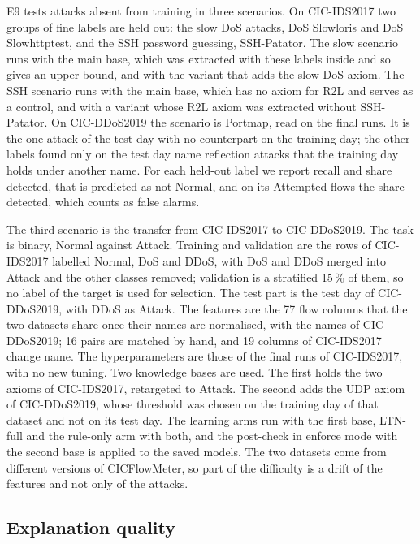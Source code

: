 E9 tests attacks absent from training in three scenarios. On CIC-IDS2017 two groups of fine labels
are held out: the slow DoS attacks, DoS Slowloris and DoS Slowhttptest, and the SSH password
guessing, SSH-Patator. The slow scenario runs with the main base, which was extracted with these
labels inside and so gives an upper bound, and with the variant that adds the slow DoS axiom. The
SSH scenario runs with the main base, which has no axiom for R2L and serves as a control, and with
a variant whose R2L axiom was extracted without SSH-Patator. On CIC-DDoS2019 the scenario is
Portmap, read on the final runs. It is the one attack of the test day with no counterpart on the
training day; the other labels found only on the test day name reflection attacks that the
training day holds under another name. For each held-out label we report recall and share
detected, that is predicted as not Normal, and on its Attempted flows the share detected, which
counts as false alarms.

The third scenario is the transfer from CIC-IDS2017 to CIC-DDoS2019. The task is binary, Normal
against Attack. Training and validation are the rows of CIC-IDS2017 labelled Normal, DoS and DDoS,
with DoS and DDoS merged into Attack and the other classes removed; validation is a stratified
15\,\% of them, so no label of the target is used for selection. The test part is the test day of
CIC-DDoS2019, with DDoS as Attack. The features are the 77 flow columns that the two datasets share
once their names are normalised, with the names of CIC-DDoS2019; 16 pairs are matched by hand, and 19
columns of CIC-IDS2017 change name. The hyperparameters
are those of the final runs of CIC-IDS2017, with no new tuning. Two knowledge bases are used. The
first holds the two axioms of CIC-IDS2017, retargeted to Attack. The second adds the UDP axiom of
CIC-DDoS2019, whose threshold was chosen on the training day of that dataset and not on its test
day. The learning arms run with the first base, LTN-full and the rule-only arm with both, and the
post-check in enforce mode with the second base is applied to the saved models. The two datasets
come from different versions of CICFlowMeter, so part of the difficulty is a drift of the features
and not only of the attacks.

\subsection{Explanation quality}
\label{sec:explanation-quality}

